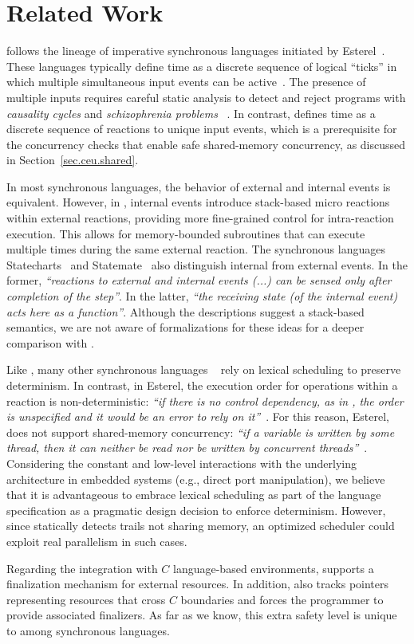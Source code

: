 \section{Related Work}

\CEU follows the lineage of imperative synchronous languages initiated by
Esterel~\cite{esterel.ieee91}.
These languages typically define time as a discrete sequence of logical
``ticks'' in which multiple simultaneous input events can be
active~\cite{ceu.tecs17}.
%
The presence of multiple inputs requires careful static analysis to detect and
reject programs with \emph{causality cycles} and \emph{schizophrenia problems}%
~\cite{esterel.constructive}.
%
In contrast, \CEU defines time as a discrete sequence of reactions to
unique input events, which is a prerequisite for the concurrency checks that
enable safe shared-memory concurrency, as discussed in
Section~\ref{sec.ceu.shared}.

In most synchronous languages, the behavior of external and internal events is
equivalent.
However, in \CEU, internal events introduce stack-based micro reactions within
external reactions, providing more fine-grained control for intra-reaction
execution.
%
This allows for memory-bounded subroutines that can execute multiple times
during the same external reaction.
%
The synchronous languages Statecharts~\cite{statecharts.variants} and
Statemate~\cite{statecharts.statemate} also distinguish internal from external
events.
In the former, \emph{``reactions to external and internal events (...) can be
sensed only after completion of the step''}.
In the latter, \emph{``the receiving state (of the internal event) acts here as
a function''}.
Although the descriptions suggest a stack-based semantics, we are not aware of
formalizations for these ideas for a deeper comparison with \CEU.

Like \CEU, many other synchronous languages%
~\cite{rp.rc,wsn.protothreads,wsn.sol,rp.synchc,rp.pretc}
rely on lexical scheduling to preserve determinism.
%
In contrast, in Esterel, the execution order for operations within a reaction
is non-deterministic: \emph{``if there is no control dependency, as in
{\scriptsize{}},
the order is unspecified and it would be an error to rely on
it''}~\cite{esterel.primer}.
%
For this reason, Esterel, does not support shared-memory concurrency:
\emph{``if a variable is written by some thread, then it can neither be read
nor be written by concurrent threads''}~\cite{esterel.primer}.
%
Considering the constant and low-level interactions with the underlying
architecture in embedded systems (e.g., direct port manipulation), we believe
that it is advantageous to embrace lexical scheduling as part of the language
specification as a pragmatic design decision to enforce determinism.
%
However, since \CEU statically detects trails not sharing memory, an optimized
scheduler could exploit real parallelism in such cases.

Regarding the integration with $C$ language-based environments, \CEU
supports a finalization mechanism for external resources.
%
In addition, \CEU also tracks pointers representing resources that cross $C$
boundaries and forces the programmer to provide associated finalizers.
%
As far as we know, this extra safety level is unique to \CEU among synchronous
languages.
